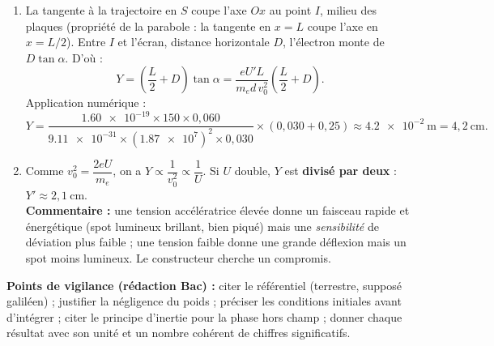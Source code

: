\documentclass[11pt]{article}
\begin{document}
\begin{corrige}
\begin{enumerate}
\begin{enumerate}
\item La tangente à la trajectoire en $S$ coupe l'axe $Ox$ au point $I$, milieu des plaques (propriété de la parabole : la tangente en $x=L$ coupe l'axe en $x = L/2$). Entre $I$ et l'écran, distance horizontale $D$, l'électron monte de $D\tan\alpha$. D'où :
\[
Y = \left(\frac{L}{2} + D\right)\tan\alpha = \frac{eU'L}{m_e d\, v_0^2}\left(\frac{L}{2} + D\right).
\]
Application numérique :
\[
Y = \frac{\num{1,60e-19}\times 150\times 0,060}{\num{9,11e-31}\times(\num{1,87e7})^2\times 0,030}\times(0,030 + 0,25) \approx \num{4,2e-2}~\mathrm{m} = 4,2~\mathrm{cm}.
\]
\item Comme $v_0^2 = \dfrac{2eU}{m_e}$, on a $Y \propto \dfrac{1}{v_0^2} \propto \dfrac{1}{U}$. Si $U$ double, $Y$ est \textbf{divisé par deux} : $Y' \approx 2,1~\mathrm{cm}$.\\
\textbf{Commentaire :} une tension accélératrice élevée donne un faisceau rapide et énergétique (spot lumineux brillant, bien piqué) mais une \emph{sensibilité} de déviation plus faible ; une tension faible donne une grande déflexion mais un spot moins lumineux. Le constructeur cherche un compromis.
\end{enumerate}
\end{enumerate}
\textbf{Points de vigilance (rédaction Bac) :} citer le référentiel (terrestre, supposé galiléen) ; justifier la négligence du poids ; préciser les conditions initiales avant d'intégrer ; citer le principe d'inertie pour la phase hors champ ; donner chaque résultat avec son unité et un nombre cohérent de chiffres significatifs.
\end{corrige}
\end{document}
